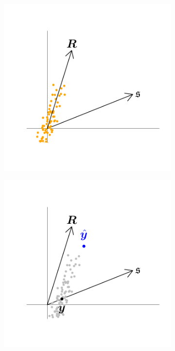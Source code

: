 \documentclass[12pt]{article}
\theoremstyle{definition}
\theoremstyle{property}
\begin{document}
	\begin{figure}
		\centering
		\begin{subfigure}[t]{0.45\textwidth}
			\centering
			\includegraphics[width=\linewidth]{Figs/InsampDir_1.pdf}
		\end{subfigure}
		\hfill
		\begin{subfigure}[t]{0.45\textwidth}
			\centering
			\includegraphics[width=\linewidth]{Figs/InsampDir_2.pdf}
		\end{subfigure}
		

\end{figure}
\end{document}
